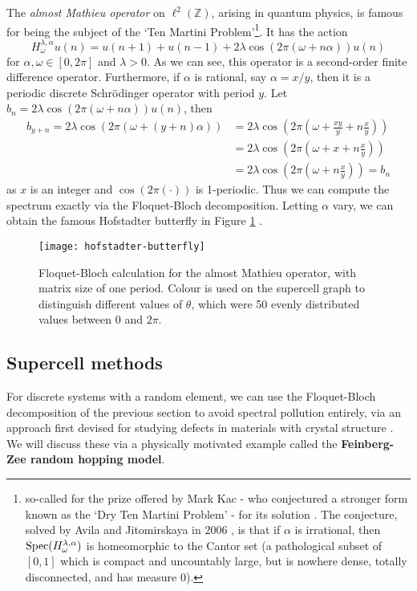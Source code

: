 \documentclass[../main.tex]{subfiles}
\begin{document}
\begin{example}
The \emph{almost Mathieu operator} on $\ell^2(\mathbb{Z})$, arising in quantum physics,
is famous for being the subject of the `Ten Martini Problem'\footnote{so-called
for the prize offered by Mark Kac - who conjectured a stronger form known as the
`Dry Ten Martini Problem' - for its solution \cite{simon1982almost}.
The conjecture, solved by Avila and Jitomirskaya in 2006 \cite{avila2006ten},
is that if $\alpha$ is irrational, then $\mathrm{Spec}(H_\omega^{\lambda, \alpha})$
is homeomorphic to the Cantor set (a pathological subset of $[0, 1]$ which is 
compact and uncountably large, but is nowhere dense, totally disconnected, and has measure 0).}.
It has the action
  $$H_\omega^{\lambda, \alpha} u(n) = u(n+1) + u(n-1) + 2\lambda \cos(2\pi (\omega + n \alpha))u(n)$$
for $\alpha, \omega \in [0, 2\pi]$ and $\lambda > 0$. As we can see, this
operator is a second-order finite difference operator. Furthermore, if
$\alpha$ is rational, say $\alpha = x/y$, then it is a periodic discrete
Schr\"odinger operator with period $y$.
Let $b_n = 2\lambda \cos(2\pi (\omega + n \alpha))u(n)$, then
\begin{align*} 
  b_{y+n} = 2\lambda \cos(2\pi (\omega + (y + n) \alpha)) 
	& = 2\lambda \cos(2\pi (\omega +  \frac{xy}{y} + n \frac{x}{y})) \\
  & = 2\lambda \cos(2\pi (\omega + x + n \frac{x}{y})) \\
  & = 2\lambda \cos(2\pi (\omega + n \frac{x}{y})) = b_n 
\end{align*}
  as $x$ is an integer and $\cos(2\pi(\cdot))$ is 1-periodic. Thus we can compute the
spectrum exactly via the Floquet-Bloch decomposition. Letting $\alpha$ vary, we can obtain
the famous Hofstadter butterfly in Figure \ref{fig:hofstadter-butterfly} \cite{hofstadter1976energy}.

\begin{figure}[p!] \centering
\texttt{[image: hofstadter-butterfly]}
\caption{Floquet-Bloch calculation for the almost Mathieu operator, with matrix
	size of one period. Colour is used on the supercell graph to
	distinguish different values of $\theta$, which were 50 evenly
	distributed values between $0$ and $2 \pi$.}
\label{fig:hofstadter-butterfly}
\end{figure}
\clearpage
\end{example}

\subsection{Supercell methods} For discrete systems with
a random element, we can use the Floquet-Bloch decomposition of the previous
section to avoid spectral pollution entirely, via an approach first devised for
studying defects in materials with crystal structure
\cite{nieminen2007supercell}. We will discuss these via a physically motivated
example called the \textbf{Feinberg-Zee random hopping model}.
\end{document}
